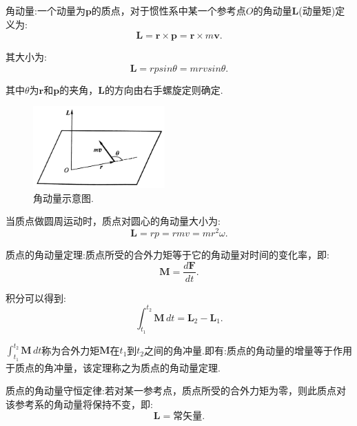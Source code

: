 \documentclass[UTF8]{ctexart}
\begin{document}
	角动量:一个动量为${\boldsymbol p}$的质点，对于惯性系中某一个参考点$O$的角动量${\boldsymbol L}$(动量矩)定义为:
	\begin{equation*}
		{\boldsymbol L}={\boldsymbol r}\times{\boldsymbol p}={\boldsymbol r}\times m{\boldsymbol v}.
	\end{equation*}

	其大小为:
	\begin{equation*}
		{\boldsymbol L}=rpsin\theta=mrvsin\theta.
	\end{equation*}

	其中$\theta$为${\boldsymbol r}$和${\boldsymbol p}$的夹角，${\boldsymbol L}$的方向由右手螺旋定则确定.
	\begin{figure}[h]
		\begin{center}
		\includegraphics[width=0.45\textwidth]{jiaodongliang-2}
		\caption{角动量示意图.}
		\end{center}
	\end{figure}

	当质点做圆周运动时，质点对圆心的角动量大小为:
	\begin{equation*}
		{\boldsymbol L}=rp=rmv=mr^2\omega.
	\end{equation*}

	质点的角动量定理:质点所受的合外力矩等于它的角动量对时间的变化率，即:
	\begin{equation*}
		{\boldsymbol M}=\frac{d{\boldsymbol F}}{dt}.
	\end{equation*}

	积分可以得到:
	\begin{equation*}
		\int_{t_1}^{t_2}{\boldsymbol M} \,dt={\boldsymbol L}_2-{\boldsymbol L}_1.
	\end{equation*}

	$\int_{t_1}^{t_2}{\boldsymbol M} \,dt$称为合外力矩${\boldsymbol M}$在$t_1$到$t_2$之间的角冲量.即有:质点的角动量的增量等于作用于质点的角冲量，该定理称之为质点的角动量定理.

	质点的角动量守恒定律:若对某一参考点，质点所受的合外力矩为零，则此质点对该参考系的角动量将保持不变，即:
	\begin{equation*}
		{\boldsymbol L}=\text{常矢量}.
	\end{equation*}	
\end{document}
